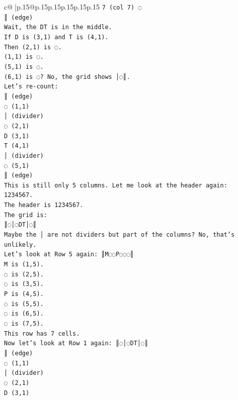 \documentclass{article}
\begin{document}
{\begin{supertabular}{c@{$\;$}|p{.15\linewidth}@{}p{.15\linewidth}p{.15\linewidth}p{.15\linewidth}p{.15\linewidth}p{.15\linewidth}}
{{{\texttt{7 (col 7) ◌} \\
\texttt{║ (edge)} \\
\texttt{Wait, the DT is in the middle.} \\
\texttt{If D is (3,1) and T is (4,1).} \\
\texttt{Then (2,1) is ◌.} \\
\texttt{(1,1) is ◌.} \\
\texttt{(5,1) is ◌.} \\
\texttt{(6,1) is ◌? No, the grid shows │◌║.} \\
\texttt{Let's re{-}count:} \\
\texttt{║ (edge)} \\
\texttt{◌ (1,1)} \\
\texttt{│ (divider)} \\
\texttt{◌ (2,1)} \\
\texttt{D (3,1)} \\
\texttt{T (4,1)} \\
\texttt{│ (divider)} \\
\texttt{◌ (5,1)} \\
\texttt{║ (edge)} \\
\texttt{This is still only 5 columns. Let me look at the header again: 1234567.} \\
\texttt{The header is 1234567.} \\
\texttt{The grid is:} \\
\texttt{║◌│◌DT│◌║} \\
\texttt{Maybe the │ are not dividers but part of the columns? No, that's unlikely.} \\
\texttt{Let's look at Row 5 again: ║M◌◌P◌◌◌║} \\
\texttt{M is (1,5).} \\
\texttt{◌ is (2,5).} \\
\texttt{◌ is (3,5).} \\
\texttt{P is (4,5).} \\
\texttt{◌ is (5,5).} \\
\texttt{◌ is (6,5).} \\
\texttt{◌ is (7,5).} \\
\texttt{This row has 7 cells.} \\
\texttt{Now let's look at Row 1 again: ║◌│◌DT│◌║} \\
\texttt{║ (edge)} \\
\texttt{◌ (1,1)} \\
\texttt{│ (divider)} \\
\texttt{◌ (2,1)} \\
\texttt{D (3,1)} \\
}}}
\end{supertabular}}
\end{document}
